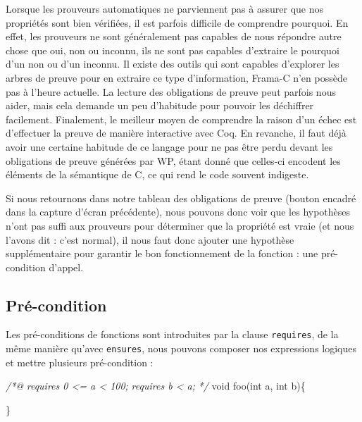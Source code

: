 \documentclass[12pt,francais,]{scrbook}
\newenvironment{Shaded}{}{}
\newcommand{\DataTypeTok}[1]{\textcolor[rgb]{0.56,0.13,0.00}{{#1}}}
\newcommand{\CommentTok}[1]{\textcolor[rgb]{0.38,0.63,0.69}{\textit{{#1}}}}
\newcommand{\NormalTok}[1]{{#1}}
\begin{document}
Lorsque les prouveurs automatiques ne parviennent pas à assurer que nos
propriétés sont bien vérifiées, il est parfois difficile de comprendre
pourquoi. En effet, les prouveurs ne sont généralement pas capables de
nous répondre autre chose que \og{}oui\fg{}, \og{}non\fg{} ou \og{}inconnu\fg{}, ils ne
sont pas capables d'extraire le \og{}pourquoi\fg{} d'un \og{}non\fg{} ou d'un
\og{}inconnu\fg{}. Il existe des outils qui sont capables d'explorer les
arbres de preuve pour en extraire ce type d'information, Frama-C n'en
possède pas à l'heure actuelle. La lecture des obligations de preuve
peut parfois nous aider, mais cela demande un peu d'habitude pour
pouvoir les déchiffrer facilement. Finalement, le meilleur moyen de
comprendre la raison d'un échec est d'effectuer la preuve de manière
interactive avec Coq. En revanche, il faut déjà avoir une certaine
habitude de ce langage pour ne pas être perdu devant les obligations de
preuve générées par WP, étant donné que celles-ci encodent les éléments
de la sémantique de C, ce qui rend le code souvent indigeste.

Si nous retournons dans notre tableau des obligations de preuve (bouton
encadré dans la capture d'écran précédente), nous pouvons donc voir que
les hypothèses n'ont pas suffi aux prouveurs pour déterminer que la
propriété est vraie (et nous l'avons dit : c'est normal), il nous faut
donc ajouter une hypothèse supplémentaire pour garantir le bon
fonctionnement de la fonction : une pré-condition d'appel.

\subsection{Pré-condition}\label{pruxe9-condition}

Les pré-conditions de fonctions sont introduites par la clause
\texttt{requires}, de la même manière qu'avec \texttt{ensures}, nous
pouvons composer nos expressions logiques et mettre plusieurs
pré-condition :

\begin{footnotesize}\begin{Shaded}
\begin{Highlighting}[]
\CommentTok{/*@}
\CommentTok{  requires 0 <= a < 100;}
\CommentTok{  requires b < a;}
\CommentTok{*/}
\DataTypeTok{void} \NormalTok{foo(}\DataTypeTok{int} \NormalTok{a, }\DataTypeTok{int} \NormalTok{b)\{}
  
\NormalTok{\}}
\end{Highlighting}
\end{Shaded}\end{footnotesize}
\end{document}
